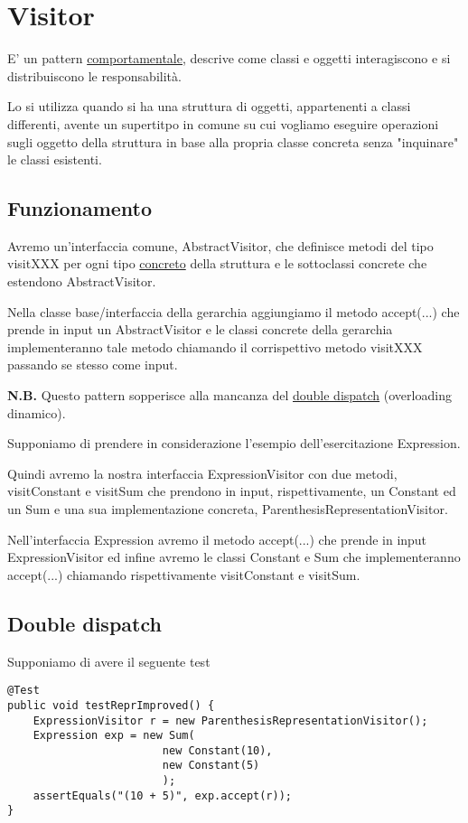 \chapter{Visitor}

E' un pattern \underline{comportamentale}, descrive come classi e oggetti interagiscono e si distribuiscono le responsabilità. 
\smallskip

Lo si utilizza quando si ha una struttura di oggetti, appartenenti a classi differenti, avente un supertitpo in comune su cui vogliamo eseguire operazioni sugli 
oggetto della struttura in base alla propria classe concreta senza "inquinare" le classi esistenti.

\section{Funzionamento}

Avremo un'interfaccia comune, AbstractVisitor, che definisce metodi del tipo visitXXX per ogni tipo \underline{concreto} della struttura e le sottoclassi concrete che 
estendono AbstractVisitor.

Nella classe base/interfaccia della gerarchia aggiungiamo il metodo accept(...) che prende in input un AbstractVisitor e le classi concrete della gerarchia 
implementeranno tale metodo chiamando il corrispettivo metodo visitXXX passando se stesso come input.
\medskip

\textbf{N.B.} Questo pattern sopperisce alla mancanza del \underline{double dispatch}  (overloading dinamico).
\medskip

Supponiamo di prendere in considerazione l'esempio dell'esercitazione Expression.

Quindi avremo la nostra interfaccia ExpressionVisitor con due metodi, visitConstant e visitSum che prendono in input, rispettivamente, un Constant ed un Sum e una sua 
implementazione concreta, ParenthesisRepresentationVisitor. 

Nell'interfaccia Expression avremo il metodo accept(...) che prende in input ExpressionVisitor ed infine avremo le classi Constant e Sum che implementeranno accept(...) 
chiamando rispettivamente visitConstant e visitSum.

\section{Double dispatch}

Supponiamo di avere il seguente test

\begin{lstlisting}
@Test
public void testReprImproved() {
    ExpressionVisitor r = new ParenthesisRepresentationVisitor();
    Expression exp = new Sum(
                        new Constant(10),
                        new Constant(5)
                        );
    assertEquals("(10 + 5)", exp.accept(r));
}
\end{lstlisting}

